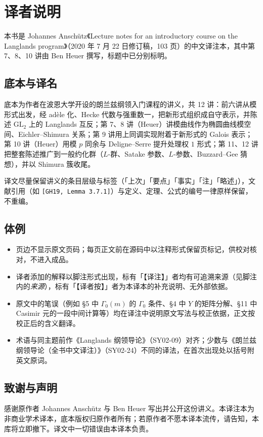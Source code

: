 \chapter*{译者说明}

本书是 Johannes Anschütz《Lecture notes for an introductory course on the Langlands program》（2020 年 7 月 22 日修订稿，103 页）的中文译注本，其中第 7、8、10 讲由 Ben Heuer 撰写，标题中已分别标明。

\section*{底本与译名}

底本为作者在波恩大学开设的朗兰兹纲领入门课程的讲义，共 12 讲：前六讲从模形式出发，经 adèle 化、Hecke 代数与强重数一，把新形式组织成自守表示，并陈述 $\mathrm{GL}_2$ 上的 Langlands 互反；第 7、8 讲（Heuer）讲模曲线作为椭圆曲线模空间、Eichler--Shimura 关系；第 9 讲用上同调实现附着于新形式的 Galois 表示；第 10 讲（Heuer）用模 $p$ 同余与 Deligne--Serre 提升处理权 $1$ 形式；第 11、12 讲把整套陈述推广到一般约化群（$L$-群、Satake 参数、$L$-参数、Buzzard--Gee 猜想），并以 Shimura 簇收尾。

译文尽量保留讲义的条目层级与标签（「上次」「要点」「事实」「注」「略述」），文献引用（如 \texttt{[GH19, Lemma 3.7.1]}）与定义、定理、公式的编号一律原样保留，不重编。

\section*{体例}

\begin{itemize}
\item 页边不显示原文页码；每页正文前在源码中以注释形式保留页标记，供校对核对，不进入成品。
\item 译者添加的解释以脚注形式出现，标有「【译注】」者均有可追溯来源（见脚注内的\emph{来源}），标有「【译者按】」者为本译本的补充说明、无外部依据。
\item 原文中的笔误（例如 \S 5 中 $\Gamma_0(m)$ 的 $\Gamma_0$ 条件、\S 4 中 $Y$ 的矩阵分解、\S 11 中 Casimir 元的一段中间计算等）均在译注中说明原文写法与校正依据，正文按校正后的含义翻译。
\item 术语与同主题前作《Langlands 纲领导论》（SY02-09）对齐；少数与《朗兰兹纲领导论（全书中文译注）》（SY02-24）不同的译法，在首次出现处以括号附英文原词。
\end{itemize}

\section*{致谢与声明}

感谢原作者 Johannes Anschütz 与 Ben Heuer 写出并公开这份讲义。本译注本为非商业学术译本，底本版权归原作者所有；若原作者不愿本译本流传，请告知，本库将立即撤下。译文中一切错误由本译本负责。
